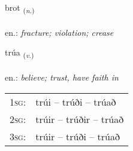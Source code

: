 \documentclass[frontgrid, backgrid]{flacards}\usepackage[]{graphicx}\usepackage[]{xcolor}
\begin{document}
\renewcommand{\blhead}{\vskip5pt {\small\bfseries\footnotesize Nafnorð | Noun }}
\renewcommand{\bcfoot}{\vskip5pt \hspace{2pt}{\small\bfseries\footnotesize 1K}}


{brot \small{\textsubscript{(\textit{n.})}} \\[1ex] %
\textphonetic{[prɔːt]} \\
en.: \emph{fracture; violation; crease} \\  [2ex]
\renewcommand*{\arraystretch}{0.8}
}

\renewcommand{\flhead}{\vskip5pt \fboxsep=0pt {\small\bfseries\footnotesize Sagnorð | Verb}}
\renewcommand{\fcfoot}{\vskip5pt \fboxsep=0pt \hspace{2pt}{\small\bfseries\footnotesize 1K}}

\renewcommand{\blhead}{\vskip5pt {\small\bfseries\footnotesize Sagnorð | Verb }}
\renewcommand{\bcfoot}{\vskip5pt \hspace{2pt}{\small\bfseries\footnotesize 1K}}


{trúa \small{\textsubscript{(\textit{v.})}} \\[1ex] %
\textphonetic{[tʰruːa]} \\
en.: \emph{believe; trust, have faith in} \\  [2ex]
\renewcommand*{\arraystretch}{0.8}
\begin{tabular}{p{1cm}l}
\textsc{1sg}: & trúi -- trúði -- trúað \\ 
\textsc{2sg}: & trúir -- trúðir -- trúað \\ 
\textsc{3sg}: & trúir -- trúði -- trúað \\ 
\end{tabular}
}

\renewcommand{\flhead}{\vskip5pt \fboxsep=0pt {\small\bfseries\footnotesize Nafnorð | Noun}}
\renewcommand{\fcfoot}{\vskip5pt \fboxsep=0pt \hspace{2pt}{\small\bfseries\footnotesize 1K}}
\end{document}
